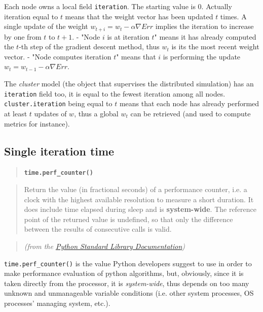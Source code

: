 \documentclass[11pt]{article}
\begin{document}
Each node owns a local field \texttt{iteration}. The starting value is
0. Actually iteration equal to \(t\) means that the weight vector has
been updated \(t\) times. A single update of the weight
\(w_{t+i} = w_t - \alpha \nabla Err\) implies the iteration to increase
by one from \(t\) to \(t+1\). - "Node \(i\) is at iteration \(t\)" means
it has already computed the \(t\)-th step of the gradient descent
method, thus \(w_t\) is its the most recent weight vector. - "Node
computes iteration \(t\)" means that \(i\) is performing the update
\(w_{t} = w_{t-1} - \alpha \nabla Err\).

The \emph{cluster} model (the object that supervises the distributed
simulation) has an \texttt{iteration} field too, it is equal to the
fewest iteration among all nodes. \texttt{cluster.iteration} being equal
to \(t\) means that each node has already performed at least \(t\)
updates of \(w\), thus a global \(w_t\) can be retrieved (and used to
compute metrics for instance).

\subsection{Single iteration time}\label{single-iteration-time}

\begin{quote}
\textbf{\texttt{time.perf\_counter()}}
\end{quote}

\begin{quote}
Return the value (in fractional seconds) of a performance counter, i.e.
a clock with the highest available resolution to measure a short
duration. It does include time elapsed during sleep and is
\textbf{system-wide}. The reference point of the returned value is
undefined, so that only the difference between the results of
consecutive calls is valid.
\end{quote}

\begin{quote}
\emph{(from the
\href{https://docs.python.org/3/library/time.html\#time.perf_counter}{Python
Standard Library Documentation})}
\end{quote}

\texttt{time.perf\_counter()} is the value Python developers suggest to
use in order to make performance evaluation of python algorithms, but,
obviously, since it is taken directly from the processor, it is
\emph{system-wide}, thus depends on too many unknown and unmanageable
variable conditions (i.e. other system processes, OS processes' managing
system, etc.).
\end{document}
